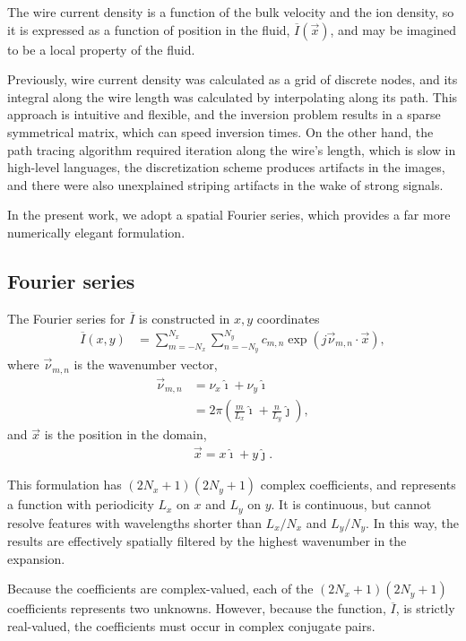 \documentclass{article}
\def\I{\overline{I}}
\def\x{\vec{x}}
\def\vnu{\vec{\nu}_{m,n}}
\def\ui{\hat{\imath}}
\def\uj{\hat{\jmath}}
\begin{document}
The wire current density is a function of the bulk velocity and the ion density, so it is expressed as a function of position in the fluid, $\I(\x)$, and may be imagined to be a local property of the fluid. 

Previously, wire current density was calculated as a grid of discrete nodes, and its integral along the wire length was calculated by interpolating along its path.  This approach is intuitive and flexible, and the inversion problem results in a sparse symmetrical matrix, which can speed inversion times.  On the other hand, the path tracing algorithm required iteration along the wire's length, which is slow in high-level languages, the discretization scheme produces artifacts in the images, and there were also unexplained striping artifacts in the wake of strong signals.

In the present work, we adopt a spatial Fourier series, which provides a far more numerically elegant formulation.

\subsection{Fourier series}

The Fourier series for $\I$ is constructed in $x,y$ coordinates
\begin{align}
\I(x,y) &= \sum_{m=-N_x}^{N_x} \sum_{n=-N_y}^{N_y} c_{m,n} \exp\left(j \vnu \cdot \x \right),\label{eqn:Ibar}
\end{align}
where $\vnu$ is the wavenumber vector,
\begin{align}
\vnu &= \nu_x \ui + \nu_y \ui\nonumber\\
 &=2\pi \left( \frac{m}{L_x} \ui + \frac{n}{L_y} \uj \right),
\end{align}
and $\x$ is the position in the domain,
\begin{align}
\x = x \ui + y \uj.
\end{align}

This formulation has $(2N_x+1)(2N_y+1)$ complex coefficients, and represents a function with periodicity $L_x$ on $x$ and $L_y$ on $y$.  It is continuous, but cannot resolve features with wavelengths shorter than $L_x / N_x$ and $L_y / N_y$.  In this way, the results are effectively spatially filtered by the highest wavenumber in the expansion.

Because the coefficients are complex-valued, each of the $(2N_x+1)(2N_y+1)$ coefficients represents two unknowns.  However, because the function, $\I$, is strictly real-valued, the coefficients must occur in complex conjugate pairs.
\end{document}
